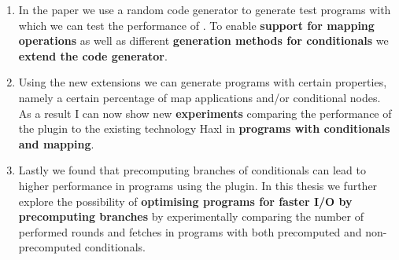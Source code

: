 \begin{enumerate}
    \item In the \yauhau{} paper we use a random code generator to generate test programs with which we can test the performance of \yauhau{}.
    To enable \textbf{support for mapping operations} as well as different \textbf{generation methods for conditionals} we \textbf{extend the code generator}.
    \item Using the new extensions we can generate programs with certain properties, namely a certain percentage of map applications and/or conditional nodes.
    As a result I can now show new \textbf{experiments} comparing the performance of the \yauhau{} plugin to the existing technology Haxl in \textbf{programs with conditionals and mapping}.
    \item Lastly we found that precomputing branches of conditionals can lead to higher performance in programs using the \yauhau{} plugin.
    In this thesis we further explore the possibility of \textbf{optimising programs for faster I/O by precomputing branches} by experimentally comparing the number of performed rounds and fetches in programs with both precomputed and non-precomputed conditionals.
\end{enumerate}
